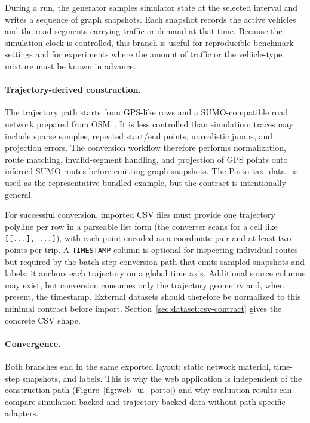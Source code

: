 During a run, the generator samples simulator state at the selected interval and writes a sequence of graph snapshots. Each snapshot records the active vehicles and the road segments carrying traffic or demand at that time. Because the simulation clock is controlled, this branch is useful for reproducible benchmark settings and for experiments where the amount of traffic or the vehicle-type mixture must be known in advance.

\paragraph{Trajectory-derived construction.}
The trajectory path starts from GPS-like rows and a SUMO-compatible road network prepared from OSM~\cite{osm}. It is less controlled than simulation: traces may include sparse samples, repeated start/end points, unrealistic jumps, and projection errors. The conversion workflow therefore performs normalization, route matching, invalid-segment handling, and projection of GPS points onto inferred SUMO routes before emitting graph snapshots. The Porto taxi data~\cite{porto2015pkdd} is used as the representative bundled example, but the contract is intentionally general.

For successful conversion, imported CSV files must provide one trajectory polyline per row in a parseable list form (the converter scans for a cell like \texttt{[[...], ...]}), with each point encoded as a coordinate pair and at least two points per trip. A \texttt{TIMESTAMP} column is optional for inspecting individual routes but required by the batch step-conversion path that emits sampled snapshots and labels; it anchors each trajectory on a global time axis. Additional source columns may exist, but conversion consumes only the trajectory geometry and, when present, the timestamp. External datasets should therefore be normalized to this minimal contract before import. Section~\ref{sec:dataset:csv-contract} gives the concrete CSV shape.

\paragraph{Convergence.}
Both branches end in the same exported layout: static network material, time-step snapshots, and labels. This is why the web application is independent of the construction path (Figure~\ref{fig:web_ui_porto}) and why evaluation results can compare simulation-backed and trajectory-backed data without path-specific adapters.


